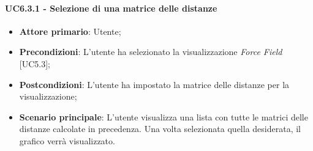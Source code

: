 \paragraph{UC6.3.1 - Selezione di una matrice delle distanze}
\begin{itemize}
	\item \textbf{Attore primario}: Utente;
	\item \textbf{Precondizioni}: L'utente ha selezionato la visualizzazione \textit{Force Field} [UC5.3];
	\item \textbf{Postcondizioni}: L'utente ha impostato la matrice delle distanze per la visualizzazione;
	
	\item \textbf{Scenario principale}: L'utente visualizza una lista con tutte le matrici delle distanze calcolate in precedenza. Una volta selezionata quella desiderata, il grafico verrà visualizzato.
\end{itemize}